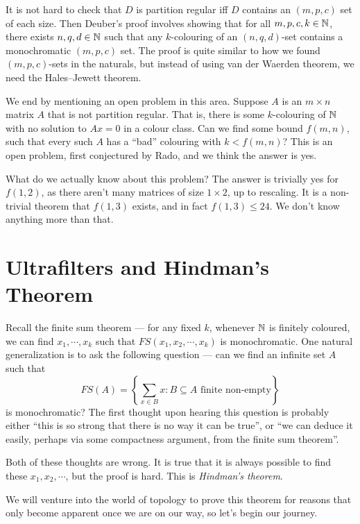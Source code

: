 \documentclass[a4paper]{article}
\begin{document}
It is not hard to check that $D$ is partition regular iff $D$ contains an $(m, p, c)$ set of each size. Then Deuber's proof involves showing that for all $m, p, c, k \in \mathbb{N}$, there exists $n, q, d \in \mathbb{N} $ such that any $k$-colouring of an $(n, q, d)$-set contains a monochromatic $(m, p, c)$ set. The proof is quite similar to how we found $(m, p, c)$-sets in the naturals, but instead of using van der Waerden theorem, we need the Hales--Jewett theorem.

\separator

We end by mentioning an open problem in this area. Suppose $A$ is an $m \times n $ matrix $A$ that is not partition regular. That is, there is some $k$-colouring of $\mathbb{N}$ with no solution to $Ax = 0$ in a colour class. Can we find some bound $f(m, n)$, such that every such $A$ has a ``bad'' colouring with $k < f(m, n)$? This is an open problem, first conjectured by Rado, and we think the answer is yes.

What do we actually know about this problem? The answer is trivially yes for $f(1, 2)$, as there aren't many matrices of size $1 \times 2$, up to rescaling. It is a non-trivial theorem that $f(1, 3)$ exists, and in fact $f(1, 3) \leq 24$. We don't know anything more than that.

\section{Ultrafilters and Hindman's Theorem}
Recall the finite sum theorem --- for any fixed $k$, whenever $\mathbb{N}$ is finitely coloured, we can find $x_1, \cdots, x_k$ such that $FS(x_1, x_2, \cdots, x_k)$ is monochromatic. One natural generalization is to ask the following question --- can we find an infinite set $A$ such that
\[
  FS(A) = \left\{\sum_{x \in B} x : B \subseteq A\text{ finite non-empty}\right\}
\]
is monochromatic? The first thought upon hearing this question is probably either ``this is so strong that there is no way it can be true'', or ``we can deduce it easily, perhaps via some compactness argument, from the finite sum theorem''.

Both of these thoughts are wrong. It is true that it is always possible to find these $x_1, x_2, \cdots$, but the proof is hard. This is \emph{Hindman's theorem}.

We will venture into the world of topology to prove this theorem for reasons
that only become apparent once we are on our way, so let's begin our journey.
\end{document}
